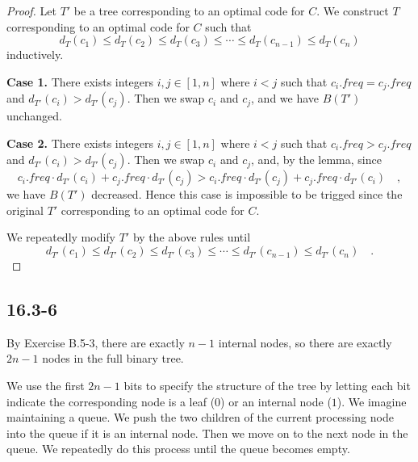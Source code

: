 \begin{proof}
    Let $T'$ be a tree corresponding to an optimal code for $C$.
    We construct $T$ corresponding to an optimal code
    for $C$ such that 
    \begin{equation*}
        d_T(c_1) \leq d_T(c_2) \leq d_T(c_3) \leq 
        \cdots \leq d_T(c_{n-1}) \leq d_T(c_n)
    \end{equation*}
    inductively.

    \textbf{Case 1.}
    There exists integers $i,j \in [1,n]$ where $i < j$ such that
    $c_i.freq = c_j.freq$ and $d_{T'}(c_i) > d_{T'}(c_j)$.
    Then we swap $c_i$ and $c_j$, and we have $B(T')$ unchanged.

    \textbf{Case 2.}
    There exists integers $i,j \in [1,n]$ where $i < j$ such that
    $c_i.freq > c_j.freq$ and $d_{T'}(c_i) > d_{T'}(c_j)$.
    Then we swap $c_i$ and $c_j$, and, by the lemma, since
    \begin{equation*}
        c_i.freq \cdot d_{T'}(c_i) + c_j.freq \cdot d_{T'}(c_j)
        > c_i.freq \cdot d_{T'}(c_j) + c_j.freq \cdot d_{T'}(c_i)
        \quad ,
    \end{equation*}
    we have $B(T')$ decreased.
    Hence this case is impossible to be trigged
    since the original $T'$ corresponding to an optimal code for $C$.

    We repeatedly modify $T'$ by the above rules until
    \begin{equation*}
        d_{T'}(c_1) \leq d_{T'}(c_2) \leq d_{T'}(c_3) \leq 
        \cdots \leq d_{T'}(c_{n-1}) \leq d_{T'}(c_n)
        \quad .
    \end{equation*}
\end{proof}

\subsection*{16.3-6}

By Exercise B.5-3, there are exactly $n - 1$ internal nodes,
so there are exactly $2n - 1$ nodes in the full binary tree.

We use the first $2n - 1$ bits to specify the structure of the tree
by letting each bit indicate the corresponding node is a leaf ($0$) or an internal node ($1$).
We imagine maintaining a queue.
We push the two children of the current processing node 
into the queue if it is an internal node.
Then we move on to the next node in the queue.
We repeatedly do this process until the queue becomes empty.

